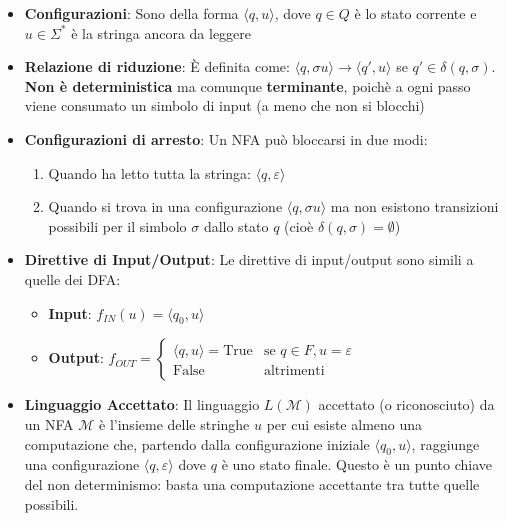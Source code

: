 \documentclass[12pt, a4paper]{report}
\begin{document}
                \begin{itemize}
                    \item \textbf{Configurazioni}: Sono della forma $\langle q, u \rangle$, dove $q \in Q$ è lo stato corrente e $u \in \Sigma^*$ è la stringa ancora da leggere
                    \item \textbf{Relazione di riduzione}: È definita come: $\langle q, \sigma u \rangle \to \langle q', u \rangle$ se $q' \in \delta(q, \sigma)$. \textbf{Non è deterministica} ma comunque \textbf{terminante}, poichè a ogni passo viene consumato un simbolo di input (a meno che non si blocchi)
                    \item \textbf{Configurazioni di arresto}: Un NFA può bloccarsi in due modi: \begin{enumerate}
                        \item Quando ha letto tutta la stringa: $\langle q, \varepsilon \rangle$
                        \item Quando si trova in una configurazione $\langle q, \sigma u \rangle$ ma non esistono transizioni possibili per il simbolo $\sigma$ dallo stato $q$ (cioè $\delta(q, \sigma) = \emptyset$)
                    \end{enumerate}
                    \item \textbf{Direttive di Input/Output}: Le direttive di input/output sono simili a quelle dei DFA: \begin{itemize}
                        \item \textbf{Input}: $f_{IN}(u) = \langle q_0, u \rangle$
                        \item \textbf{Output}: $f_{OUT}=\begin{cases}
                            \langle q, u \rangle = \text{True} & \text{se }q \in F, u = \varepsilon\\
                            \text{False} & \text{altrimenti}
                        \end{cases}$
                    \end{itemize}
                    \item \textbf{Linguaggio Accettato}: Il linguaggio $L(\mathcal{M})$ accettato (o riconosciuto) da un NFA $\mathcal{M}$ è l'insieme delle stringhe $u$ per cui esiste almeno una computazione che, partendo dalla configurazione iniziale $\langle q_0, u \rangle$, raggiunge una configurazione $\langle q, \varepsilon \rangle$ dove $q$ è uno stato finale. Questo è un punto chiave del non determinismo: basta una computazione accettante tra tutte quelle possibili.\\

\end{itemize}
\end{document}
